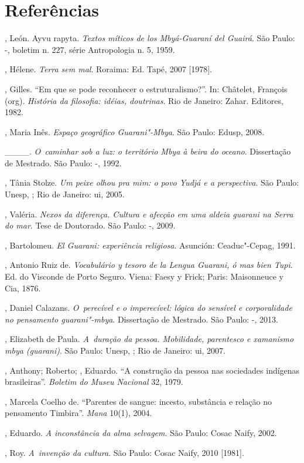 \section{Referências}

\begin{Parskip}
, León. Ayvu rapyta. \emph{Textos míticos de los Mbyá-Guaraní del
Guairá}. São Paulo: -, boletim n. 227, série Antropologia n. 5,
1959.

, Hélene. \emph{Terra sem mal}. Roraima: Ed. Tapé, 2007 [1978].

, Gilles. ``Em que se pode reconhecer o estruturalismo?''.
In: Châtelet, François (org). \emph{História da filosofia: idéias,
doutrinas}. Rio de Janeiro: Zahar. Editores, 1982.

, Maria Inês. \emph{Espaço geográfico Guarani"-Mbya}. São Paulo:
Edusp, 2008.

\_\_\_\_. \emph{O~caminhar sob a luz: o território Mbya à beira do oceano}. 
Dissertação de Mestrado. São Paulo: -, 1992.

, Tânia Stolze. \emph{Um peixe olhou pra mim: o povo Yudjá e a
perspectiva}. São Paulo: Unesp, ; Rio de Janeiro: ui, 2005.

, Valéria. \emph{Nexos da diferença. Cultura e afecção em uma
aldeia guarani na Serra do mar}. Tese de Doutorado. São Paulo:
-, 2009.

, Bartolomeu. \emph{El Guarani: experiência religiosa}. Asunción:
Ceaduc"-Cepag, 1991.

, Antonio Ruiz de. \emph{Vocabulário y tesoro de la Lengua
Guarani, ó mas bien Tupi}. Ed. do Visconde de Porto Seguro. Viena: Faesy
y Frick; Paris: Maisonneuce y Cia, 1876.

, Daniel Calazans. \emph{O~perecível e o imperecível: lógica do
sensível e corporalidade no pensamento guarani"-mbya}. Dissertação de
Mestrado. São Paulo: -, 2013.

, Elizabeth de Paula. \emph{A~duração da pessoa. Mobilidade,
parentesco e xamanismo mbya (guarani)}. São Paulo: Unesp, ; Rio de
Janeiro: ui, 2007.

, Anthony;  Roberto; , Eduardo. ``A
construção da pessoa nas sociedades indígenas brasileiras''. \emph{Boletim do
Museu Nacional} 32, 1979. 

, Marcela Coelho de. ``Parentes de sangue: incesto, substância
e relação no pensamento Timbira''. \emph{Mana} 10(1), 2004.

, Eduardo. \emph{A inconstância da alma selvagem}. São
Paulo: Cosac Naify, 2002.

, Roy. \emph{A~invenção da cultura}. São Paulo: Cosac Naify, 2010
[1981].
\end{Parskip}

